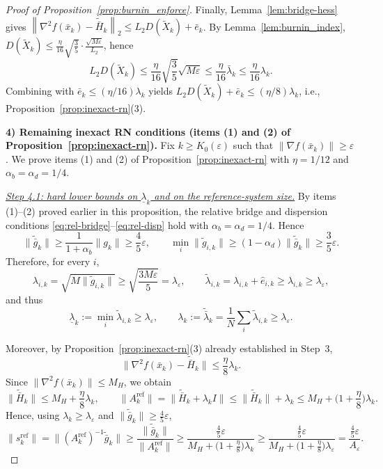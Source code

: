 \documentclass[11pt,a4paper]{article}
\newcommand{\normtwo}[1]{\left\|#1\right\|_2}
\begin{document}
\begin{proof}[Proof of Proposition~\ref{prop:burnin_enforce}]
		Finally, Lemma~\ref{lem:bridge-hess} gives
		$\normtwo{\nabla^2 f(\bar x_k)-\tilde{\bar H}_k}\le L_2D(\tilde X_k)+\bar e_k$.
		By Lemma~\ref{lem:burnin_index}, $D(\tilde X_k)\le \frac{\eta}{16}\sqrt{\frac{3}{5}}\cdot\frac{\sqrt{M\varepsilon}}{L_2}$, hence
		\[
		L_2D(\tilde X_k)\le \frac{\eta}{16}\sqrt{\frac{3}{5}}\sqrt{M\varepsilon}\le \frac{\eta}{16}\bar\lambda_k\le \frac{\eta}{16}\lambda_k.
		\]
		Combining with $\bar e_k\le (\eta/16)\lambda_k$ yields
		$L_2D(\tilde X_k)+\bar e_k\le (\eta/8)\lambda_k$, i.e., Proposition~\ref{prop:inexact-rn}(3).
		
		\medskip
	\medskip
\medskip
\noindent\textbf{4) Remaining inexact RN conditions (items (1) and (2) of Proposition~\ref{prop:inexact-rn}).}
Fix $k\ge K_0(\varepsilon)$ such that $\|\nabla f(\bar x_k)\|\ge \varepsilon$.
We prove items (1) and (2) of Proposition~\ref{prop:inexact-rn} with $\eta=1/12$ and $\alpha_b=\alpha_d=1/4$.

\smallskip
\noindent\underline{\emph{Step 4.1: hard lower bounds on $\underline\lambda_k$ and on the reference-system size.}}
By items (1)--(2) proved earlier in this proposition, the relative bridge and dispersion conditions
\eqref{eq:rel-bridge}--\eqref{eq:rel-disp} hold with $\alpha_b=\alpha_d=1/4$.
Hence
\[
\|\tilde{\bar g}_k\|\ge \frac{1}{1+\alpha_b}\|g_k\|\ge \frac{4}{5}\varepsilon,
\qquad
\min_i\|\tilde g_{i,k}\|\ge (1-\alpha_d)\|\tilde{\bar g}_k\|\ge \frac{3}{5}\varepsilon.
\]
Therefore, for every $i$,
\[
\lambda_{i,k}=\sqrt{M\|\tilde g_{i,k}\|}\ge \sqrt{\frac{3M\varepsilon}{5}}=\lambda_\varepsilon,
\qquad
\tilde\lambda_{i,k}=\lambda_{i,k}+\hat e_{i,k}\ge \lambda_{i,k}\ge \lambda_\varepsilon,
\]
and thus
\begin{equation}\label{eq:hard_lambda_lb_step4}
	\underline\lambda_k:=\min_i\tilde\lambda_{i,k}\ge \lambda_\varepsilon,
	\qquad
	\lambda_k:=\tilde{\bar\lambda}_k=\frac1N\sum_i\tilde\lambda_{i,k}\ge \lambda_\varepsilon.
\end{equation}

Moreover, by Proposition~\ref{prop:inexact-rn}(3) already established in Step~3,
\[
\|\nabla^2 f(\bar x_k)-\tilde{\bar H}_k\|\le \frac{\eta}{8}\lambda_k.
\]
Since $\|\nabla^2 f(\bar x_k)\|\le M_H$, we obtain
\[
\|\tilde{\bar H}_k\|\le M_H+\frac{\eta}{8}\lambda_k,
\qquad
\|A_k^{\mathrm{ref}}\|
=\|\tilde{\bar H}_k+\lambda_k I\|
\le \|\tilde{\bar H}_k\|+\lambda_k
\le M_H+\Big(1+\frac{\eta}{8}\Big)\lambda_k.
\]
Hence, using $\lambda_k\ge \lambda_\varepsilon$ and $\|\tilde{\bar g}_k\|\ge \frac45\varepsilon$,
\begin{equation}\label{eq:sref_hard_lb_step4}
	\|s_k^{\mathrm{ref}}\|
	=\|(A_k^{\mathrm{ref}})^{-1}\tilde{\bar g}_k\|
	\ge \frac{\|\tilde{\bar g}_k\|}{\|A_k^{\mathrm{ref}}\|}
	\ge \frac{\frac45\varepsilon}{M_H+\big(1+\frac{\eta}{8}\big)\lambda_k}
	\ge \frac{\frac45\varepsilon}{M_H+\big(1+\frac{\eta}{8}\big)\lambda_\varepsilon}
	=\frac{\frac45\varepsilon}{A_\varepsilon}.
\end{equation}


\end{proof}
\end{document}
